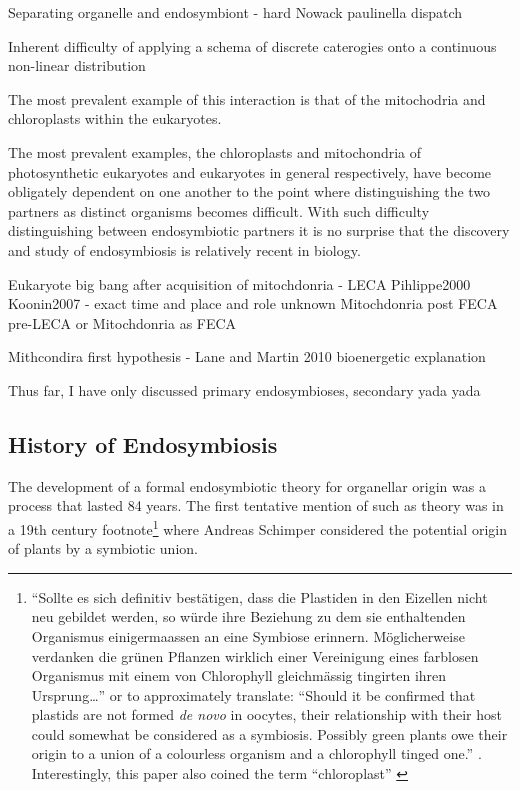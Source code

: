 Separating organelle and endosymbiont - hard \citep{Keeling2008} Nowack paulinella dispatch

Inherent difficulty of applying a schema of discrete caterogies onto a continuous non-linear distribution



The most prevalent example of this interaction is that of the mitochodria and chloroplasts 
within the eukaryotes.

The most prevalent examples, the chloroplasts and mitochondria of photosynthetic eukaryotes and 
eukaryotes in general respectively, have become obligately dependent on one another to the point where distinguishing 
the two partners as distinct organisms becomes difficult.
With such difficulty distinguishing between endosymbiotic partners it is no 
surprise that the discovery and study of endosymbiosis is relatively recent in 
biology. 



Eukaryote big bang after acquisition of mitochdonria - LECA Pihlippe2000 Koonin2007 - exact time and place and role unknown
Mitochdonria post FECA pre-LECA or Mitochdonria as FECA

Mithcondira first hypothesis - Lane and Martin 2010 bioenergetic explanation




Thus far, I have only discussed primary endosymbioses, secondary yada yada







\subsection{History of Endosymbiosis}
The development of a formal endosymbiotic theory for organellar origin was a process that
lasted 84 years. The first tentative mention of such as theory was in a 19th century footnote\footnote{``Sollte es sich definitiv best\"atigen, dass die Plastiden in den 
Eizellen nicht neu gebildet werden, so w\"urde ihre Beziehung zu dem sie 
enthaltenden Organismus einigermaassen an eine Symbiose erinnern. M\"oglicherweise
verdanken die gr\"unen Pflanzen wirklich einer Vereinigung eines farblosen Organismus
mit einem von Chlorophyll gleichm\"assig tingirten ihren Ursprung\ldots''
\citep{Schimper1883} or to approximately translate: ``Should it be confirmed
that plastids are not formed \textit{de novo} in oocytes, their relationship with
their host could somewhat be considered as a symbiosis.  Possibly green plants owe
their origin to a union of a colourless organism and a chlorophyll tinged one.''
\citep{Neuhauser2014}. Interestingly, this paper also coined the term ``chloroplast'' \citep{Sapp2002}} 
where Andreas Schimper considered the potential origin of plants by a symbiotic union. 


